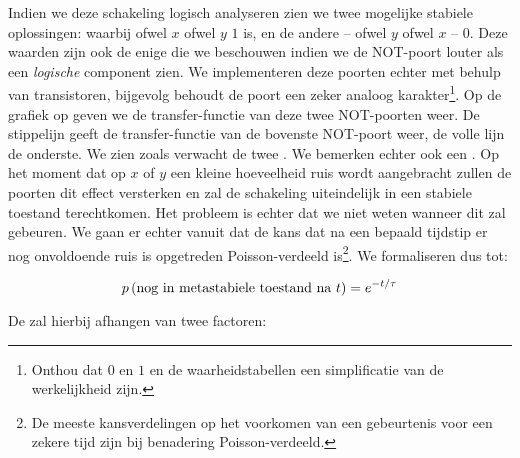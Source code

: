 Indien we deze schakeling logisch analyseren zien we twee mogelijke stabiele oplossingen: waarbij ofwel $x$ ofwel $y$ $1$ is, en de andere -- ofwel $y$ ofwel $x$ -- $0$. Deze waarden zijn ook de enige die we beschouwen indien we de NOT-poort louter als een \emph{logische} component zien. We implementeren deze poorten echter met behulp van transistoren, bijgevolg behoudt de poort een zeker analoog karakter\footnote{Onthou dat $0$ en $1$ en de waarheidstabellen een simplificatie van de werkelijkheid zijn.}. Op de grafiek op  geven we de transfer-functie van deze twee NOT-poorten weer. De stippelijn geeft de transfer-functie van de bovenste NOT-poort weer, de volle lijn de onderste. We zien zoals verwacht de twee . We bemerken echter ook een . Op het moment dat op $x$ of $y$ een kleine hoeveelheid ruis wordt aangebracht zullen de poorten dit effect versterken en zal de schakeling uiteindelijk in een stabiele toestand terechtkomen. Het probleem is echter dat we niet weten wanneer dit zal gebeuren. We gaan er echter vanuit dat de kans dat na een bepaald tijdstip er nog onvoldoende ruis is opgetreden Poisson-verdeeld is\footnote{De meeste kansverdelingen op het voorkomen van een gebeurtenis voor een zekere tijd zijn bij benadering Poisson-verdeeld.}. We formaliseren dus tot:

\begin{equation}
p\left( \mbox{nog in metastabiele toestand na $t$} \right)=e^{-t/\tau}
\end{equation}

De  zal hierbij afhangen van twee factoren:

